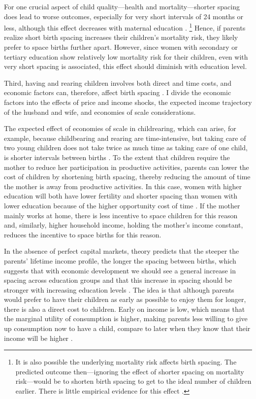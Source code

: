 For one crucial aspect of child quality---health and mortality---shorter spacing 
does lead to worse outcomes, especially for very short intervals of 24 months or less,
although this effect decreases with maternal education
\citep{Whitworth2002,Conde-Agudelo2006,Conde-Agudelo2012,Molitoris2019}.%
\footnote{
It is also possible the underlying mortality risk affects birth 
spacing.
The predicted outcome then---ignoring the effect of shorter spacing on mortality risk---would be to shorten 
birth spacing to get to the ideal number of children earlier.
There is little empirical evidence for this effect \citep{Newman1983,Newman1988,Bhalotra2008}.
}
Hence, if parents realize short birth spacing increases their children's mortality risk, 
they likely prefer to space births further apart.
However, since women with secondary or tertiary education show relatively low mortality 
risk for their children, even with very short spacing is associated, this effect should
diminish with education level.


Third, having and rearing children involves both direct and time costs, and economic 
factors can, therefore, affect birth spacing \citep{Hotz1997,Schultz1997}.
I divide the economic factors into the effects of price and income shocks,
the expected income trajectory of the husband and wife,
and economies of scale considerations.

The expected effect of economies of scale in childrearing, which can arise, for example, because
childbearing and rearing are time-intensive, but taking care of two young children does not take 
twice as much time as taking care of one child, is shorter intervals between births
\citep{Vijverberg1982,Espenshade1984}.
To the extent that children require the mother to reduce her participation 
in productive activities, parents can lower the cost of children by shortening birth spacing, 
thereby reducing the amount of time the mother is away from productive activities.
In this case, women with higher education will both have lower fertility and shorter
spacing than women with lower education because of the higher opportunity cost of time 
\citep{Ross1974,Newman1981,Newman1984}.
If the mother mainly works at home, there is less incentive to space children for this 
reason and, similarly, higher household income, holding the mother's income constant, 
reduces the incentive to space births for this reason.

In the absence of perfect capital markets, theory predicts that the steeper the parents'
lifetime income profile, the longer the spacing between births, which suggests that 
with economic development we should see a general increase in spacing across education 
groups and that this increase in spacing should be stronger with increasing education levels
\citep{Heckman1976,Wolpin1984,Newman1988}.
The idea is that although parents would prefer to have their children as early as possible 
to enjoy them for longer, there is also a direct cost to children.
Early on income is low, which means that the marginal utility of consumption is higher, 
making parents less willing to give up consumption now to have a child, compare to later 
when they know that their income will be higher \citep{Newman1984,Happel1984}.


